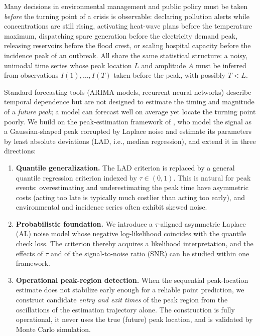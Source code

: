 \documentclass[11pt,a4paper]{article}
\begin{document}
Many decisions in environmental management and public policy must be taken
\emph{before} the turning point of a crisis is observable: declaring pollution
alerts while concentrations are still rising, activating heat-wave plans
before the temperature maximum, dispatching spare generation before the
electricity demand peak, releasing reservoirs before the flood crest, or
scaling hospital capacity before the incidence peak of an outbreak. All share
the same statistical structure: a noisy, unimodal time series whose peak
location $L$ and amplitude $A$ must be inferred from observations
$I(1),\ldots,I(T)$ taken before the peak, with possibly $T<L$.

Standard forecasting tools (ARIMA models, recurrent neural networks) describe
temporal dependence but are not designed to estimate the timing and magnitude
of a \emph{future peak}; a model can forecast well on average yet locate the
turning point poorly. We build on the peak-estimation framework of
\citet{Dermoune}, who model the signal as a Gaussian-shaped peak corrupted by
Laplace noise and estimate its parameters by least absolute deviations (LAD,
i.e., median regression), and extend it in three directions:
\begin{enumerate}
\item \textbf{Quantile generalization.} The LAD criterion is replaced by a
general quantile regression criterion indexed by $\tau\in(0,1)$. This is
natural for peak events: overestimating and underestimating the peak time have
asymmetric costs (acting too late is typically much costlier than acting too
early), and environmental and incidence series often exhibit skewed noise.
\item \textbf{Probabilistic foundation.} We introduce a $\tau$-aligned
asymmetric Laplace (AL) noise model whose negative log-likelihood coincides
with the quantile check loss. The criterion thereby acquires a likelihood
interpretation, and the effects of $\tau$ and of the signal-to-noise ratio
(SNR) can be studied within one framework.
\item \textbf{Operational peak-region detection.} When the sequential
peak-location estimate does not stabilize early enough for a reliable point
prediction, we construct candidate \emph{entry and exit times} of the peak
region from the oscillations of the estimation trajectory alone. The
construction is fully operational, it never uses the true (future) peak
location, and is validated by Monte Carlo simulation.
\end{enumerate}
\end{document}
